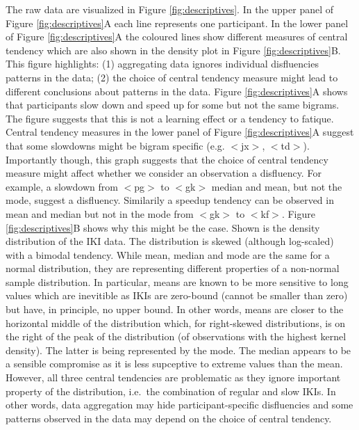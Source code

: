 \documentclass[english,man,floatsintext]{apa7}
\begin{document}
The raw data are visualized in Figure \ref{fig:descriptives}. In the upper panel of Figure \ref{fig:descriptives}A each line represents one participant. In the lower panel of Figure \ref{fig:descriptives}A the coloured lines show different measures of central tendency which are also shown in the density plot in Figure \ref{fig:descriptives}B. This figure highlights: (1) aggregating data ignores individual disfluencies patterns in the data; (2) the choice of central tendency measure might lead to different conclusions about patterns in the data. Figure \ref{fig:descriptives}A shows that participants slow down and speed up for some but not the same bigrams. The figure suggests that this is not a learning effect or a tendency to fatique. Central tendency measures in the lower panel of Figure \ref{fig:descriptives}A suggest that some slowdowns might be bigram specific (e.g. \(<\)jx\(>\), \(<\)td\(>\)). Importantly though, this graph suggests that the choice of central tendency measure might affect whether we consider an observation a disfluency. For example, a slowdown from \(<\)pg\(>\) to \(<\)gk\(>\) median and mean, but not the mode, suggest a disfluency. Similarily a speedup tendency can be observed in mean and median but not in the mode from \(<\)gk\(>\) to \(<\)kf\(>\). Figure \ref{fig:descriptives}B shows why this might be the case. Shown is the density distribution of the IKI data. The distribution is skewed (although log-scaled) with a bimodal tendency. While mean, median and mode are the same for a normal distribution, they are representing different properties of a non-normal sample distribution. In particular, means are known to be more sensitive to long values which are inevitible as IKIs are zero-bound (cannot be smaller than zero) but have, in principle, no upper bound. In other words, means are closer to the horizontal middle of the distribution which, for right-skewed distributions, is on the right of the peak of the distribution (of observations with the highest kernel density). The latter is being represented by the mode. The median appears to be a sensible compromise as it is less supceptive to extreme values than the mean. However, all three central tendencies are problematic as they ignore important property of the distribution, i.e.~the combination of regular and slow IKIs. In other words, data aggregation may hide participant-specific disfluencies and some patterns observed in the data may depend on the choice of central tendency.
\end{document}
